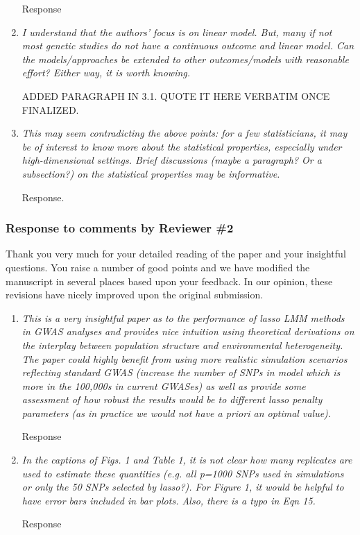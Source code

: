 \documentclass{article}
\begin{document}
\begin{enumerate}
  Response

\item \emph{I understand that the authors’ focus is on linear model. But, many if not most genetic studies do not have a continuous outcome and linear model. Can the models/approaches be extended to other outcomes/models with reasonable effort? Either way, it is worth knowing.}

  ADDED PARAGRAPH IN 3.1.  QUOTE IT HERE VERBATIM ONCE FINALIZED.

\item \emph{This may seem contradicting the above points: for a few statisticians, it may be of interest to know more about the statistical properties, especially under high-dimensional settings. Brief discussions (maybe a paragraph? Or a subsection?) on the statistical properties may be informative.}

  Response.

\end{enumerate}

\newpage

\subsubsection*{Response to comments by Reviewer \#2}

Thank you very much for your detailed reading of the paper and your insightful questions. You raise a number of good points and we have modified the manuscript in several places based upon your feedback.  In our opinion, these revisions have nicely improved upon the original submission.

\begin{enumerate}

\item \emph{This is a very insightful paper as to the performance of lasso LMM methods in GWAS analyses and provides nice intuition using theoretical derivations on the interplay between  population structure and environmental heterogeneity. The paper could highly benefit from using more realistic simulation scenarios reflecting standard GWAS (increase the number of SNPs in model which is more in the 100,000s in current GWASes) as well as provide some assessment of how robust the results would be to different lasso penalty parameters (as in practice we would not have a priori an optimal value).}

  Response

\item \emph{In the captions of Figs. 1 and Table 1, it is not clear how many replicates are used to estimate these quantities (e.g. all p=1000 SNPs used in simulations or only the 50 SNPs selected by lasso?). For Figure 1, it would be helpful to have error bars included in bar plots. Also, there is a typo in Eqn 15.}

  Response

\end{enumerate}

%
%
\end{document}
